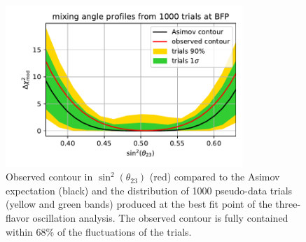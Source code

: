 \begin{figure}
    \centering
        \includegraphics[width=0.8\textwidth]{figures/measurement/three_flavor/results/mixing_brazil_band.pdf}  
  \caption{Observed contour in $\sin^2(\theta_{23})$ (red) compared to the Asimov expectation (black) and the distribution of 1000 pseudo-data trials (yellow and green bands) produced at the best fit point of the three-flavor oscillation analysis. The observed contour is fully contained within 68\% of the fluctuations of the trials.
  \label{fig:mixing_brazil_band_three_flavor}}
\end{figure}

